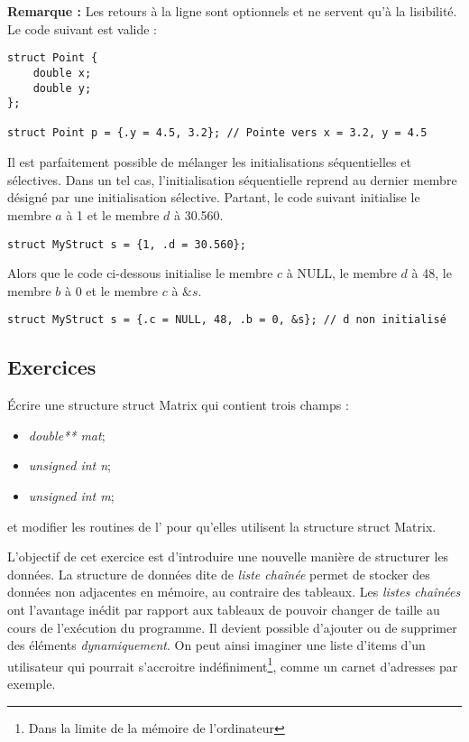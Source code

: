 \documentclass[../../../main.tex]{subfiles}
\begin{document}
\textbf{Remarque :} Les retours à la ligne sont optionnels et ne servent qu'à la lisibilité. Le code suivant est valide :
\begin{verbatim}
struct Point {
	double x;
	double y;
};

struct Point p = {.y = 4.5, 3.2}; // Pointe vers x = 3.2, y = 4.5
\end{verbatim}
Il est parfaitement possible de mélanger les initialisations séquentielles et sélectives. Dans un tel cas, l’initialisation séquentielle reprend au dernier membre désigné par une initialisation sélective. Partant, le code suivant initialise le membre $a$ à 1 et le membre $d$ à 30.560.
\begin{verbatim}
struct MyStruct s = {1, .d = 30.560};
\end{verbatim}
Alors que le code ci-dessous initialise le membre $c$ à \textsf{NULL}, le membre $d$ à 48, le membre $b$ à 0 et le membre $c$ à $\&s$.
\begin{verbatim}
struct MyStruct s = {.c = NULL, 48, .b = 0, &s}; // d non initialisé
\end{verbatim}
\subsection{Exercices}
 Écrire une structure \textsf{struct Matrix} qui contient trois champs :
\begin{itemize}
	\item \textit{double** mat};
	\item \textit{unsigned int n};
	\item \textit{unsigned int m};
\end{itemize}
et modifier les routines de l' pour qu'elles utilisent la structure \textsf{struct Matrix}.

L'objectif de cet exercice est d'introduire une nouvelle manière de structurer les données. La structure de données dite de \textit{liste chaînée} permet de stocker des données non adjacentes en mémoire, au contraire des tableaux. Les \textit{listes chaînées} ont l'avantage inédit par rapport aux tableaux de pouvoir changer de taille au cours de l'exécution du programme. Il devient possible d'ajouter ou de supprimer des éléments \textit{dynamiquement}. On peut ainsi imaginer une liste d'items d'un utilisateur qui pourrait s'accroitre indéfiniment\footnote{Dans la limite de la mémoire de l'ordinateur}, comme un carnet d'adresses par exemple.
 
\end{document}
